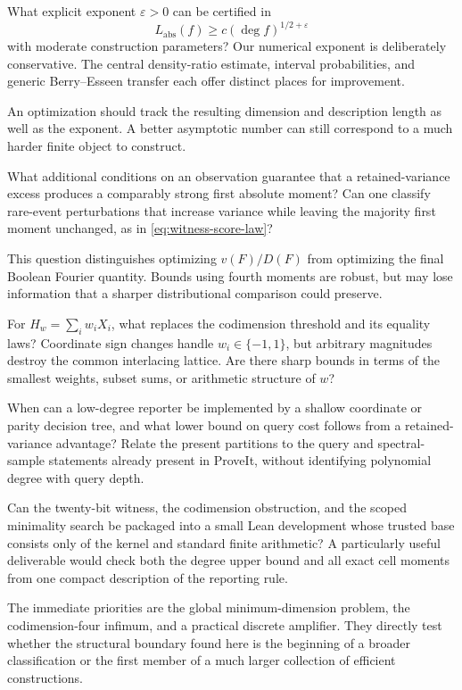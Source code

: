 \begin{question}
What explicit exponent \(\varepsilon>0\) can be certified in
\[
 L_{\mathrm{abs}}(f)\ge c(\deg f)^{1/2+\varepsilon}
\]
with moderate construction parameters? Our numerical exponent is
deliberately conservative. The central density-ratio estimate,
interval probabilities, and generic Berry--Esseen transfer each
offer distinct places for improvement.
\end{question}

An optimization should track the resulting dimension and
description length as well as the exponent. A better asymptotic
number can still correspond to a much harder finite object to
construct.

\begin{question}
What additional conditions on an observation guarantee that a
retained-variance excess produces a comparably strong first absolute
moment? Can one classify rare-event perturbations that increase
variance while leaving the majority first moment unchanged, as in
\eqref{eq:witness-score-law}?
\end{question}

This question distinguishes optimizing \(v(F)/D(F)\) from optimizing
the final Boolean Fourier quantity. Bounds using fourth moments are
robust, but may lose information that a sharper distributional
comparison could preserve.

\begin{question}
For \(H_w=\sum_iw_iX_i\), what replaces the codimension threshold and
its equality laws? Coordinate sign changes handle \(w_i\in\{-1,1\}\),
but arbitrary magnitudes destroy the common interlacing lattice.
Are there sharp bounds in terms of the smallest weights, subset sums,
or arithmetic structure of \(w\)?
\end{question}

\begin{question}
When can a low-degree reporter be implemented by a shallow coordinate
or parity decision tree, and what lower bound on query cost follows
from a retained-variance advantage? Relate the present partitions to
the query and spectral-sample statements already present in ProveIt,
without identifying polynomial degree with query depth.
\end{question}

\begin{question}
Can the twenty-bit witness, the codimension obstruction, and the
scoped minimality search be packaged into a small Lean development
whose trusted base consists only of the kernel and standard finite
arithmetic? A particularly useful deliverable would check both the
degree upper bound and all exact cell moments from one compact
description of the reporting rule.
\end{question}

The immediate priorities are the global minimum-dimension problem,
the codimension-four infimum, and a practical discrete amplifier.
They directly test whether the structural boundary found here is the
beginning of a broader classification or the first member of a much
larger collection of efficient constructions.
